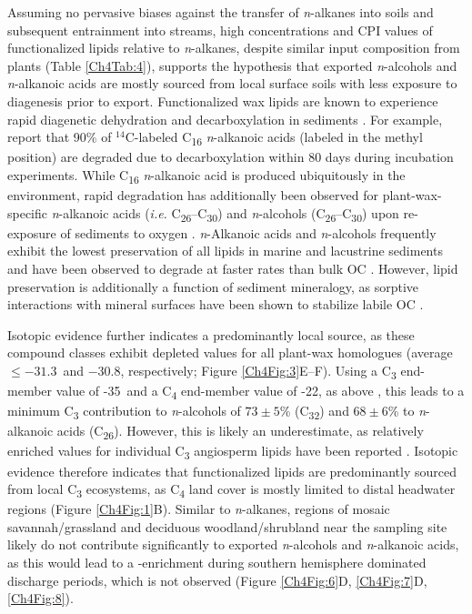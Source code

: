 Assuming no pervasive biases against the transfer of \textit{n}-alkanes into soils and subsequent entrainment into streams, high concentrations and CPI values of functionalized lipids relative to \textit{n}-alkanes, despite similar input composition from plants (Table \ref{Ch4Tab:4}), supports the hypothesis that exported \textit{n}-alcohols and \textit{n}-alkanoic acids are mostly sourced from local surface soils with less exposure to diagenesis prior to export. Functionalized wax lipids are known to experience rapid diagenetic dehydration and decarboxylation in sediments \citep{Meyers:1993up,Sun:1994wj,Canuel:1996ta,Sun:1997wr}. For example, \citet{Sun:1997wr} report that 90\% of $^{14}$C-labeled C\textsubscript{16} \textit{n}-alkanoic acids (labeled in the methyl position) are degraded due to decarboxylation within 80 days during incubation experiments. While C\textsubscript{16} \textit{n}-alkanoic acid is produced ubiquitously in the environment, rapid degradation has additionally been observed for plant-wax-specific \textit{n}-alkanoic acids (\textit{i.e.} C\textsubscript{26}--C\textsubscript{30}) and \textit{n}-alcohols (C\textsubscript{26}--C\textsubscript{30}) upon re-exposure of sediments to oxygen \citep{Hoefs:2002wu}. \textit{n}-Alkanoic acids and \textit{n}-alcohols frequently exhibit the lowest preservation of all lipids in marine and lacustrine sediments and have been observed to degrade at faster rates than bulk OC \citep{Cranwell:1981vg,Meyers:1993vwa}. However, lipid preservation is additionally a function of sediment mineralogy, as sorptive interactions with mineral surfaces have been shown to stabilize labile OC \citep[\textit{e.g.}][]{Keil:1994hb,Mayer:1994wn}.

Isotopic evidence further indicates a predominantly local source, as these compound classes exhibit depleted  values for all plant-wax homologues (average $\leq -31.3$\textperthousand\ and $-30.8$\textperthousand, respectively; Figure \ref{Ch4Fig:3}E--F). Using a C\textsubscript{3} end-member value of -35\textperthousand\ and a C\textsubscript{4} end-member value of -22\textperthousand, as above \citep{Castaneda:2011jb}, this leads to a minimum C\textsubscript{3} contribution to \textit{n}-alcohols of $73 \pm 5$\% (C\textsubscript{32}) and $68 \pm 6$\% to \textit{n}-alkanoic acids (C\textsubscript{26}). However, this is likely an underestimate, as relatively enriched  values for individual C\textsubscript{3} angiosperm lipids have been reported \citep[\textit{i.e.} up to $-30$\textperthousand; ][]{Diefendorf:2011hg,Garcin:2014hg}. Isotopic evidence therefore indicates that functionalized lipids are predominantly sourced from local C\textsubscript{3} ecosystems, as C\textsubscript{4} land cover is mostly limited to distal headwater regions (Figure \ref{Ch4Fig:1}B). Similar to \textit{n}-alkanes, regions of mosaic savannah/grassland and deciduous woodland/shrubland near the sampling site likely do not contribute significantly to exported \textit{n}-alcohols and \textit{n}-alkanoic acids, as this would lead to a -enrichment during southern hemisphere dominated discharge periods, which is not observed (Figure \ref{Ch4Fig:6}D, \ref{Ch4Fig:7}D, \ref{Ch4Fig:8}).

